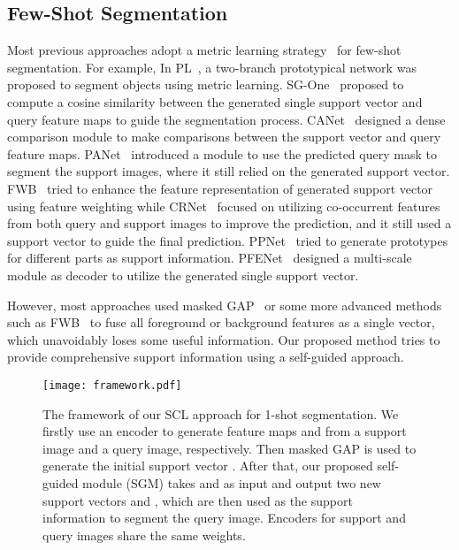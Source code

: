 \documentclass[final]{cvpr}
\begin{document}
\subsection{Few-Shot Segmentation}
Most previous approaches adopt a metric learning strategy~\cite{hu2019attention, vinyals2016matching, sung2018learning, azad2020texture, lei2020few} for few-shot segmentation. For example, In PL~\cite{dong2018few}, a two-branch prototypical network was proposed to segment objects using metric learning. SG-One~\cite{zhang2020sg} proposed to compute a cosine similarity between the generated single support vector and query feature maps to guide the segmentation process. CANet~\cite{zhang2019canet} designed a dense comparison module to make comparisons between the support vector and query feature maps. PANet~\cite{wang2019panet} introduced a module to use the predicted query mask to segment the support images, where it still relied on the generated support vector. FWB~\cite{nguyen2019feature} tried to enhance the feature representation of generated support vector using feature weighting while CRNet~\cite{liu2020crnet} focused on utilizing co-occurrent features from both query and support images to improve the prediction, and it still used a support vector to guide the final prediction. PPNet~\cite{liu2020part} tried to generate  prototypes for different parts as support information. PFENet~\cite{tian2020prior} designed a multi-scale module as decoder to utilize the generated single support vector. 

However, most approaches used masked GAP~\cite{zhou2016learning} or some more advanced methods such as FWB~\cite{nguyen2019feature} to fuse all foreground or background features as a single vector, which unavoidably loses some useful information. Our proposed method tries to provide comprehensive support information using a self-guided approach. 

\begin{figure*}
	\centering
	\texttt{[image: framework.pdf]}
	\caption{The framework of our SCL approach for 1-shot segmentation. We firstly use an encoder to generate feature maps  and  from a support image and a query image, respectively. Then masked GAP is used to generate the initial support vector . After that, our proposed self-guided module (SGM) takes  and  as input and output two new support vectors  and , which are then used as the support information to segment the query image. Encoders for support and query images share the same weights.}
	\label{fig:framework}
\end{figure*}
\end{document}
